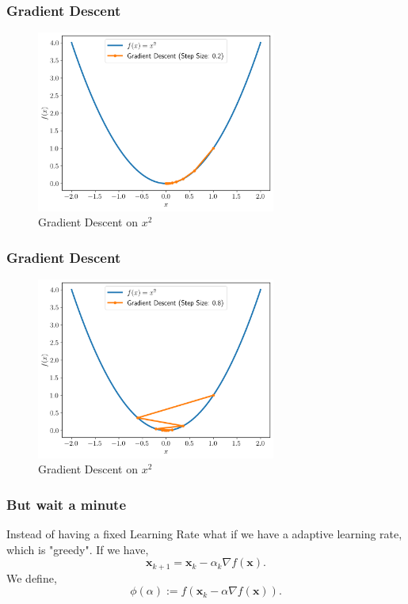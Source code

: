 \documentclass{beamer}
\begin{document}
\begin{frame}[t]
	\frametitle{Gradient Descent}
	\begin{figure}[htpb]
		\centering
		\includegraphics[width=0.7\textwidth]{./figs/gradient_descent_low_learning_rate}
		\caption{Gradient Descent on $x^2$}
		\label{fig:}
	\end{figure}
\end{frame}
\begin{frame}[t]
	\frametitle{Gradient Descent}
	\begin{figure}[htpb]
		\centering
		\includegraphics[width=0.7\textwidth]{./figs/gradient_descent_high_learning_rate}
		\caption{Gradient Descent on $x^2$}
		\label{fig:}
	\end{figure}
\end{frame}
\begin{frame}[t]
	\frametitle{But wait a minute}
	Instead of having a fixed Learning Rate what if we have a adaptive learning rate, which is "greedy".
	If we have,
	\[
		\bm x_{k+1} = \bm x_{k} - \alpha_k \nabla f(\bm x)
		.\]\pause
	We define,
	\[
		\phi(\alpha) := f(\bm x_k-\alpha \nabla f(\bm x))
		.\]
\end{frame}
\end{document}
